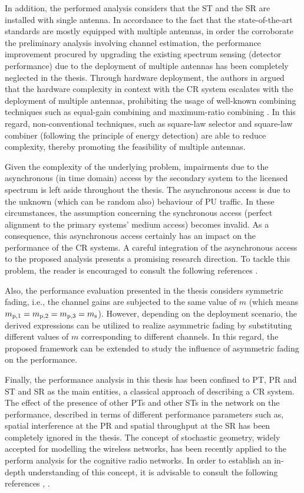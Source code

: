 In addition, the performed analysis considers that the ST and the SR are installed with single antenna. In accordance to the fact that the state-of-the-art standards are mostly equipped with multiple antennas, in order the corroborate the preliminary analysis involving channel estimation, the performance improvement procured by upgrading the existing spectrum sensing (detector performance) due to the deployment of multiple antennas \cite{Dig07,Tah10} has been completely neglected in the thesis. Through hardware deployment, the authors in  argued that the hardware complexity in context with the CR system escalates with the deployment of multiple antennas, prohibiting the usage of well-known combining techniques such as equal-gain combining and maximum-ratio combining \cite{Alouini03}. In this regard, non-conventional techniques, such as square-law selector and square-law combiner (following the principle of energy detection) are able to reduce complexity, thereby promoting the feasibility of multiple antennas. 

Given the complexity of the underlying problem, impairments due to the asynchronous (in time domain) access by the secondary system to the licensed spectrum is left aside throughout the thesis. The asynchronous access is due to the unknown (which can be random also) behaviour of PU traffic. In these circumstances, the assumption concerning the synchronous access (perfect alignment to the primary systems' medium access) becomes invalid. As a consequence, this asynchronous access certainly has an impact on the performance of the CR systems. A careful integration of the asynchronous access to the proposed analysis presents a promising research direction. To tackle this problem, the reader is encouraged to consult the following references \cite{Jiang13_, Jiang15}.

Also, the performance evaluation presented in the thesis considers symmetric fading, i.e., the channel gains are subjected to the same value of $m$ (which means $m_{\text{p,1}} = m_{\text{p,2}} = m_{\text{p,3}} = m_{\text{s}}$). However, depending on the deployment scenario, the derived expressions can be utilized to realize asymmetric fading \cite{Sura08} by substituting different values of $m$ corresponding to different channels. In this regard, the proposed framework can be extended to study the influence of asymmetric fading on the performance. 

Finally, the performance analysis in this thesis has been confined to PT, PR and ST and SR as the main entities, a classical approach of describing a CR system. The effect of the presence of other PTs and other STs in the network on the performance, described in terms of different performance parameters such as, spatial interference at the PR and spatial throughput at the SR has been completely ignored in the thesis. The concept of stochastic geometry, widely accepted for modelling the wireless networks, has been recently applied to the perform analysis for the cognitive radio networks. In order to establish an in-depth understanding of this concept, it is advisable to consult the following references \cite{Ghasemi08, Lee12, Kusal12, Kusal13, Elsawy13, Song14}, . 

